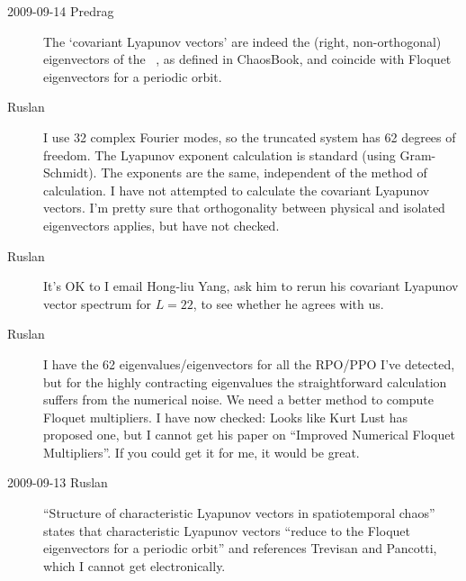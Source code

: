 \begin{description}
\item[2009-09-14 Predrag]
The `covariant Lyapunov vectors' are indeed the (right,
non-orthogonal) eigenvectors of the \jacobianM\ \jMps, as
defined in ChaosBook, and coincide with Floquet eigenvectors
for a periodic orbit.

 \item[Ruslan] I use 32 complex Fourier modes, so the
truncated system has 62 degrees of freedom.  The Lyapunov
exponent calculation is standard (using Gram-Schmidt).  The
exponents are the same, independent of the method of
calculation.  I have not attempted to calculate the covariant
Lyapunov vectors. I'm pretty sure that
orthogonality between physical and isolated eigenvectors
applies, but have not checked.

 \item[Ruslan]
It's OK to I email Hong-liu
Yang, ask him to rerun his covariant
Lyapunov vector spectrum for $L=22$, to see whether he agrees
with us.

 \item[Ruslan]
I have the 62 eigenvalues/eigenvectors for all the RPO/PPO
I've detected, but for the highly contracting eigenvalues
the straightforward calculation
suffers from the numerical noise. We need a
better method to compute Floquet multipliers. I have now
checked:   Looks like {Kurt Lust} has proposed one, but I
cannot get his paper on ``Improved Numerical Floquet
Multipliers''. If you could
get it for me, it would be great.

\item[2009-09-13 Ruslan]
``Structure of characteristic Lyapunov
vectors in spatiotemporal chaos'' states
that characteristic Lyapunov vectors ``reduce to the Floquet
eigenvectors for a periodic orbit'' and references Trevisan
and Pancotti, which I cannot get electronically.


\end{description}
